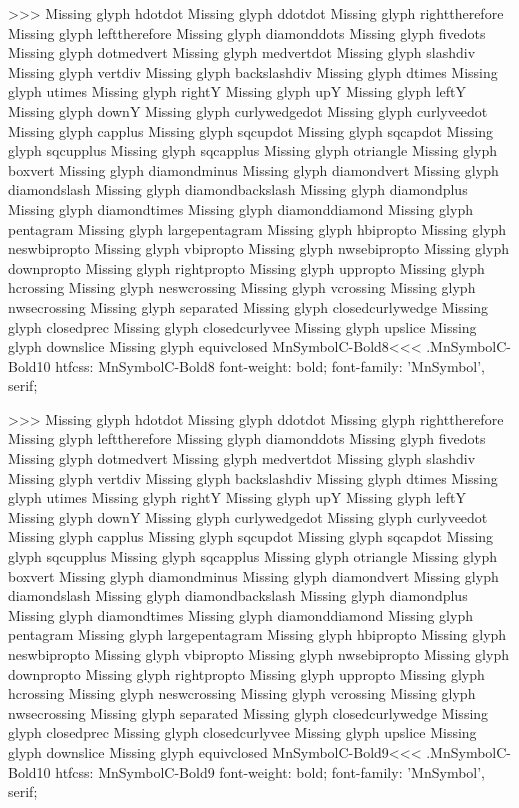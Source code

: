 >>>
Missing glyph	hdotdot
Missing glyph	ddotdot
Missing glyph	righttherefore
Missing glyph	lefttherefore
Missing glyph	diamonddots
Missing glyph	fivedots
Missing glyph	dotmedvert
Missing glyph	medvertdot
Missing glyph	slashdiv
Missing glyph	vertdiv
Missing glyph	backslashdiv
Missing glyph	dtimes
Missing glyph	utimes
Missing glyph	rightY
Missing glyph	upY
Missing glyph	leftY
Missing glyph	downY
Missing glyph	curlywedgedot
Missing glyph	curlyveedot
Missing glyph	capplus
Missing glyph	sqcupdot
Missing glyph	sqcapdot
Missing glyph	sqcupplus
Missing glyph	sqcapplus
Missing glyph	otriangle
Missing glyph	boxvert
Missing glyph	diamondminus
Missing glyph	diamondvert
Missing glyph	diamondslash
Missing glyph	diamondbackslash
Missing glyph	diamondplus
Missing glyph	diamondtimes
Missing glyph	diamonddiamond
Missing glyph	pentagram
Missing glyph	largepentagram
Missing glyph	hbipropto
Missing glyph	neswbipropto
Missing glyph	vbipropto
Missing glyph	nwsebipropto
Missing glyph	downpropto
Missing glyph	rightpropto
Missing glyph	uppropto
Missing glyph	hcrossing
Missing glyph	neswcrossing
Missing glyph	vcrossing
Missing glyph	nwsecrossing
Missing glyph	separated
Missing glyph	closedcurlywedge
Missing glyph	closedprec
Missing glyph	closedcurlyvee
Missing glyph	upslice
Missing glyph	downslice
Missing glyph	equivclosed
\<MnSymbolC-Bold8\><<<
.MnSymbolC-Bold10
htfcss:  MnSymbolC-Bold8  font-weight: bold; font-family: 'MnSymbol', serif;

>>>
Missing glyph	hdotdot
Missing glyph	ddotdot
Missing glyph	righttherefore
Missing glyph	lefttherefore
Missing glyph	diamonddots
Missing glyph	fivedots
Missing glyph	dotmedvert
Missing glyph	medvertdot
Missing glyph	slashdiv
Missing glyph	vertdiv
Missing glyph	backslashdiv
Missing glyph	dtimes
Missing glyph	utimes
Missing glyph	rightY
Missing glyph	upY
Missing glyph	leftY
Missing glyph	downY
Missing glyph	curlywedgedot
Missing glyph	curlyveedot
Missing glyph	capplus
Missing glyph	sqcupdot
Missing glyph	sqcapdot
Missing glyph	sqcupplus
Missing glyph	sqcapplus
Missing glyph	otriangle
Missing glyph	boxvert
Missing glyph	diamondminus
Missing glyph	diamondvert
Missing glyph	diamondslash
Missing glyph	diamondbackslash
Missing glyph	diamondplus
Missing glyph	diamondtimes
Missing glyph	diamonddiamond
Missing glyph	pentagram
Missing glyph	largepentagram
Missing glyph	hbipropto
Missing glyph	neswbipropto
Missing glyph	vbipropto
Missing glyph	nwsebipropto
Missing glyph	downpropto
Missing glyph	rightpropto
Missing glyph	uppropto
Missing glyph	hcrossing
Missing glyph	neswcrossing
Missing glyph	vcrossing
Missing glyph	nwsecrossing
Missing glyph	separated
Missing glyph	closedcurlywedge
Missing glyph	closedprec
Missing glyph	closedcurlyvee
Missing glyph	upslice
Missing glyph	downslice
Missing glyph	equivclosed
\<MnSymbolC-Bold9\><<<
.MnSymbolC-Bold10
htfcss:  MnSymbolC-Bold9  font-weight: bold; font-family: 'MnSymbol', serif;

